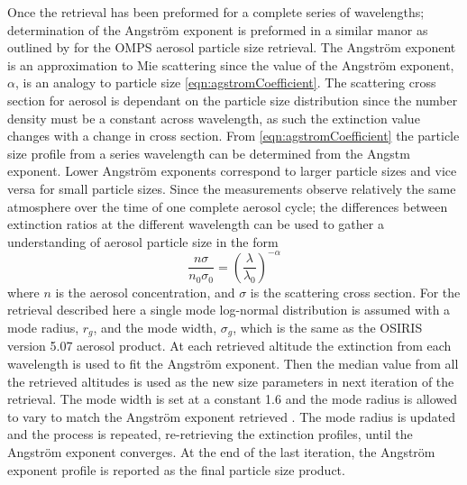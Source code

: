 \documentclass[12pt]{article}
\begin{document}
Once the retrieval has been preformed for a complete series of wavelengths; determination of the Angstr\"{o}m exponent is preformed in a similar manor as outlined by \cite{Rault2013} for the OMPS aerosol particle size retrieval. The Angstr\"{o}m exponent is an approximation to Mie scattering since the value of the Angstr\"{o}m exponent, $\alpha$, is an analogy to particle size \autoref{eqn:agstromCoefficient}. The scattering cross section for aerosol is dependant on the particle size distribution since the number density must be a constant across wavelength, as such the extinction value changes with a change in cross section. From \autoref{eqn:agstromCoefficient} the particle size profile from a series wavelength can be determined from the Angstm exponent. Lower Angstr\"{o}m exponents correspond to larger particle sizes and vice versa for small particle sizes. Since the measurements observe relatively the same atmosphere over the time of one complete aerosol cycle; the differences between extinction ratios at the different wavelength can be used to gather a understanding of aerosol particle size in the form
\begin{equation}
    \frac{n\sigma}{n_{0}\sigma_{0}} = \left(\frac{\lambda}{\lambda_{0}}\right)^{-\alpha}
    \label{eqn:agstromCoefficient}
\end{equation}
where $n$ is the aerosol concentration, and $\sigma$ is the scattering cross section. For the retrieval described here a single mode log-normal distribution is assumed with a mode radius, $r_{g}$, and the mode width, $\sigma_{g}$, which is the same as the OSIRIS version 5.07 aerosol product. At each retrieved altitude the extinction from each wavelength is used to fit the Angstr\"{o}m exponent. Then the median value from all the retrieved altitudes is used as the new size parameters in next iteration of the retrieval. The mode width is set at a constant 1.6 and the mode radius is allowed to vary to match the Angstr\"{o}m exponent retrieved \citep{Bourassa2008b, Rieger2014}. The mode radius is updated and the process is repeated, re-retrieving the extinction profiles, until the Angstr\"{o}m exponent converges. At the end of the last iteration, the Angstr\"{o}m exponent profile is reported as the final particle size product.
\end{document}

